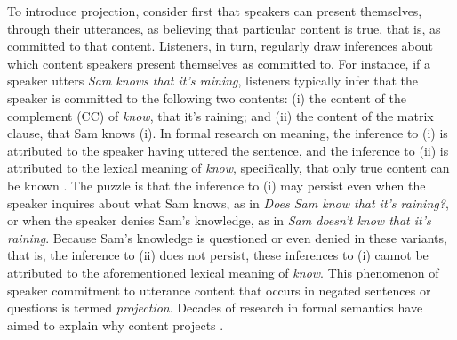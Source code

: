 \documentclass[OpenMind]{stjour}
\begin{document}
To introduce projection, consider first that speakers can present themselves, through their utterances, as believing that particular content is true, that is, as committed to that content. Listeners, in turn, regularly draw inferences about which content speakers present themselves as committed to.  For instance, if a speaker utters \emph{Sam knows that it's raining}, listeners typically infer that the speaker is committed to the following two contents: (i) the content of the complement (CC) of {\em know},  that it's raining; and (ii) the content of the matrix clause, that Sam knows (i). In formal research on meaning, the inference to (i) is attributed to the speaker having uttered the sentence, and the inference to (ii) is attributed to the lexical meaning of {\em know}, specifically, that only true content can be known \citep[e.g.,][]{ccmg90}. The puzzle is that the inference to (i) may persist even when the speaker inquires about what Sam knows, as in {\em Does Sam know that it's raining?}, or when the speaker denies Sam's knowledge, as in {\em Sam doesn't know that it's raining}. Because Sam's knowledge is questioned or even denied in these variants, that is, the inference to (ii) does not persist, these inferences to (i) cannot be attributed to the aforementioned lexical meaning of {\em know}. This phenomenon of speaker commitment to utterance content that occurs in negated sentences or questions is termed \emph{projection}. Decades of research in formal semantics have aimed to explain why content projects \citep[e.g.,][]{langendoen-savin71,beaver-geurts-sep}.
\end{document}
